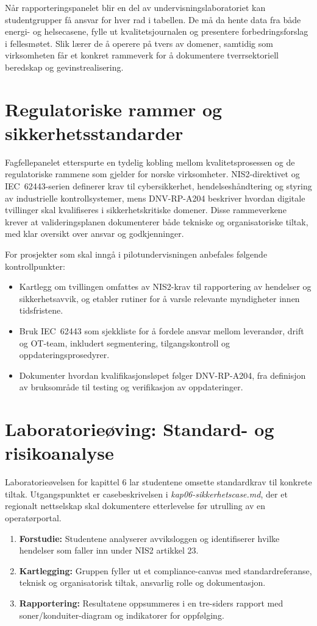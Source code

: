 Når rapporteringspanelet blir en del av undervisningslaboratoriet kan studentgrupper få ansvar for hver rad i tabellen. De må da hente data fra både energi- og helsecasene, fylle ut kvalitetsjournalen og presentere forbedringsforslag i fellesmøtet. Slik lærer de å operere på tvers av domener, samtidig som virksomheten får et konkret rammeverk for å dokumentere tverrsektoriell beredskap og gevinstrealisering.

\section{Regulatoriske rammer og sikkerhetsstandarder}
Fagfellepanelet etterspurte en tydelig kobling mellom kvalitetsprosessen og de regulatoriske rammene som gjelder for norske virksomheter. NIS2-direktivet og IEC~62443-serien definerer krav til cybersikkerhet, hendelseshåndtering og styring av industrielle kontrollsystemer, mens DNV-RP-A204 beskriver hvordan digitale tvillinger skal kvalifiseres i sikkerhetskritiske domener.\citep{eu2022nis2,iec62443-2-1,dnv2021a204} Disse rammeverkene krever at valideringsplanen dokumenterer både tekniske og organisatoriske tiltak, med klar oversikt over ansvar og godkjenninger.

For prosjekter som skal inngå i pilotundervisningen anbefales følgende kontrollpunkter:
\begin{itemize}
    \item Kartlegg om tvillingen omfattes av NIS2-krav til rapportering av hendelser og sikkerhetsavvik, og etabler rutiner for å varsle relevante myndigheter innen tidsfristene.
    \item Bruk IEC~62443 som sjekkliste for å fordele ansvar mellom leverandør, drift og OT-team, inkludert segmentering, tilgangskontroll og oppdateringsprosedyrer.
    \item Dokumenter hvordan kvalifikasjonsløpet følger DNV-RP-A204, fra definisjon av bruksområde til testing og verifikasjon av oppdateringer.
\end{itemize}
\section{Laboratorieøving: Standard- og risikoanalyse}
Laboratorieøvelsen for kapittel 6 lar studentene omsette standardkrav til konkrete tiltak. Utgangspunktet er casebeskrivelsen i \textit{kap06-sikkerhetscase.md}, der et regionalt nettselskap skal dokumentere etterlevelse før utrulling av en operatørportal.

\begin{enumerate}
    \item \textbf{Forstudie:} Studentene analyserer avviksloggen og identifiserer hvilke hendelser som faller inn under NIS2 artikkel 23.
    \item \textbf{Kartlegging:} Gruppen fyller ut et compliance-canvas med standardreferanse, teknisk og organisatorisk tiltak, ansvarlig rolle og dokumentasjon.
    \item \textbf{Rapportering:} Resultatene oppsummeres i en tre-siders rapport med soner/konduiter-diagram og indikatorer for oppfølging.
\end{enumerate}

